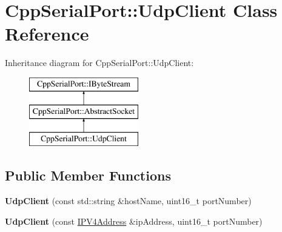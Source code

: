 \hypertarget{class_cpp_serial_port_1_1_udp_client}{}\section{Cpp\+Serial\+Port\+:\+:Udp\+Client Class Reference}
\label{class_cpp_serial_port_1_1_udp_client}
Inheritance diagram for Cpp\+Serial\+Port\+:\+:Udp\+Client\+:\begin{figure}[H]
\begin{center}
\leavevmode
\includegraphics[height=3.000000cm]{class_cpp_serial_port_1_1_udp_client}
\end{center}
\end{figure}
\subsection*{Public Member Functions}
\begin{DoxyCompactItemize}
\item 
\mbox{\label{class_cpp_serial_port_1_1_udp_client_aad37324f9f4581da620574c31ea0bc46}} 
{\bfseries Udp\+Client} (const std\+::string \&host\+Name, uint16\+\_\+t port\+Number)
\item 
\mbox{\label{class_cpp_serial_port_1_1_udp_client_abaf921b2a2ea9541a8ead4b812fcae36}} 
{\bfseries Udp\+Client} (const \mbox{\hyperlink{class_cpp_serial_port_1_1_i_p_v4_address}{I\+P\+V4\+Address}} \&ip\+Address, uint16\+\_\+t port\+Number)
\end{DoxyCompactItemize}
